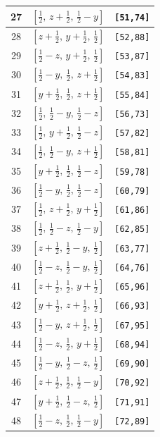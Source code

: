 \documentclass[fleqn,8pt]{jsarticle}
\begin{document}
\begin{longtable}{ccc}
27 & $\left[ \frac{1}{2},\, z + \frac{1}{2},\, \frac{1}{2} - y \right]$ & {\tt [51,74]} \\ \hline
28 & $\left[ z + \frac{1}{2},\, y + \frac{1}{2},\, \frac{1}{2} \right]$ & {\tt [52,88]} \\ \hline
29 & $\left[ \frac{1}{2} - z,\, y + \frac{1}{2},\, \frac{1}{2} \right]$ & {\tt [53,87]} \\ \hline
30 & $\left[ \frac{1}{2} - y,\, \frac{1}{2},\, z + \frac{1}{2} \right]$ & {\tt [54,83]} \\ \hline
31 & $\left[ y + \frac{1}{2},\, \frac{1}{2},\, z + \frac{1}{2} \right]$ & {\tt [55,84]} \\ \hline
32 & $\left[ \frac{1}{2},\, \frac{1}{2} - y,\, \frac{1}{2} - z \right]$ & {\tt [56,73]} \\ \hline
33 & $\left[ \frac{1}{2},\, y + \frac{1}{2},\, \frac{1}{2} - z \right]$ & {\tt [57,82]} \\ \hline
34 & $\left[ \frac{1}{2},\, \frac{1}{2} - y,\, z + \frac{1}{2} \right]$ & {\tt [58,81]} \\ \hline
35 & $\left[ y + \frac{1}{2},\, \frac{1}{2},\, \frac{1}{2} - z \right]$ & {\tt [59,78]} \\ \hline
36 & $\left[ \frac{1}{2} - y,\, \frac{1}{2},\, \frac{1}{2} - z \right]$ & {\tt [60,79]} \\ \hline
37 & $\left[ \frac{1}{2},\, z + \frac{1}{2},\, y + \frac{1}{2} \right]$ & {\tt [61,86]} \\ \hline
38 & $\left[ \frac{1}{2},\, \frac{1}{2} - z,\, \frac{1}{2} - y \right]$ & {\tt [62,85]} \\ \hline
39 & $\left[ z + \frac{1}{2},\, \frac{1}{2} - y,\, \frac{1}{2} \right]$ & {\tt [63,77]} \\ \hline
40 & $\left[ \frac{1}{2} - z,\, \frac{1}{2} - y,\, \frac{1}{2} \right]$ & {\tt [64,76]} \\ \hline
41 & $\left[ z + \frac{1}{2},\, \frac{1}{2},\, y + \frac{1}{2} \right]$ & {\tt [65,96]} \\ \hline
42 & $\left[ y + \frac{1}{2},\, z + \frac{1}{2},\, \frac{1}{2} \right]$ & {\tt [66,93]} \\ \hline
43 & $\left[ \frac{1}{2} - y,\, z + \frac{1}{2},\, \frac{1}{2} \right]$ & {\tt [67,95]} \\ \hline
44 & $\left[ \frac{1}{2} - z,\, \frac{1}{2},\, y + \frac{1}{2} \right]$ & {\tt [68,94]} \\ \hline
45 & $\left[ \frac{1}{2} - y,\, \frac{1}{2} - z,\, \frac{1}{2} \right]$ & {\tt [69,90]} \\ \hline
46 & $\left[ z + \frac{1}{2},\, \frac{1}{2},\, \frac{1}{2} - y \right]$ & {\tt [70,92]} \\ \hline
47 & $\left[ y + \frac{1}{2},\, \frac{1}{2} - z,\, \frac{1}{2} \right]$ & {\tt [71,91]} \\ \hline
48 & $\left[ \frac{1}{2} - z,\, \frac{1}{2},\, \frac{1}{2} - y \right]$ & {\tt [72,89]} \\
\end{longtable}
\end{document}
